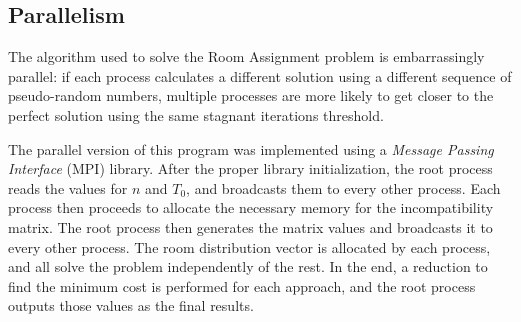 \subsection{Parallelism}
\label{sec:parallelism}
The algorithm used to solve the Room Assignment problem is embarrassingly parallel: if each process calculates a different solution using a different sequence of pseudo-random numbers, multiple processes are more likely to get closer to the perfect solution using the same stagnant iterations threshold.

The parallel version of this program was implemented using a \textit{Message Passing Interface} (MPI) library. After the proper library initialization, the root process reads the values for $n$ and $T_{0}$, and broadcasts them to every other process. Each process then proceeds to allocate the necessary memory for the incompatibility matrix. The root process then generates the matrix values and broadcasts it to every other process. The room distribution vector is allocated by each process, and all solve the problem independently of the rest. In the end, a reduction to find the minimum cost is performed for each approach, and the root process outputs those values as the final results.